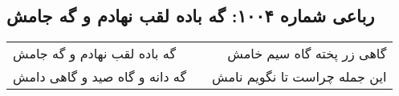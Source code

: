 \begin{center}
\section*{رباعی شماره ۱۰۰۴: گه باده لقب نهادم و گه جامش}
\label{sec:1004}
\begin{longtable}{l p{0.5cm} r}
گه باده لقب نهادم و گه جامش
&&
گاهی زر پخته گاه سیم خامش
\\
گه دانه و گاه صید و گاهی دامش
&&
این جمله چراست تا نگویم نامش
\\
\end{longtable}
\end{center}
